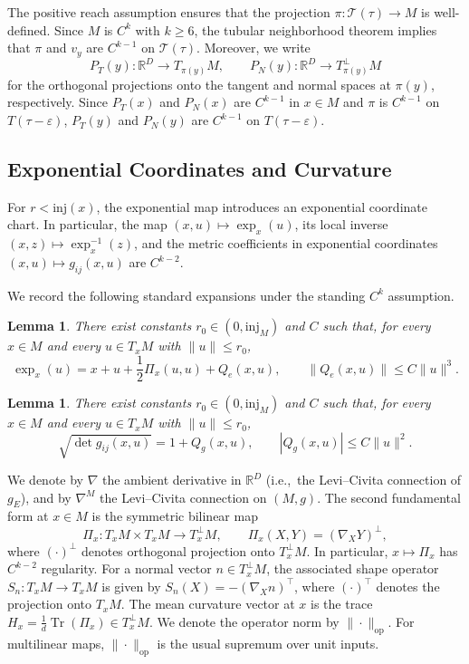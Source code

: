 \documentclass[11pt]{article}
\theoremstyle{plain}
\newtheorem{lemma}[theorem]{Lemma}
\theoremstyle{definition}
\begin{document}
The positive reach assumption ensures that the projection $\pi \colon \mathcal T(\tau) \to M$ is well-defined. Since $M$ is $C^k$ with $k \ge 6$, the tubular neighborhood theorem implies that $\pi$ and $v_y$ are $C^{k-1}$ on $\mathcal T(\tau)$. 
Moreover, we write
\[
P_T(y):\mathbb R^D\to T_{\pi(y)}M,
\qquad
P_N(y):\mathbb R^D\to T_{\pi(y)}^\perp M
\]
for the orthogonal projections onto the tangent and normal spaces at $\pi(y)$, respectively. Since $P_T(x)$ and $P_N(x)$ are $C^{k-1}$ in $x\in M$ and $\pi$ is $C^{k-1}$ on $T(\tau-\varepsilon)$, $P_T(y)$ and $P_N(y)$ are $C^{k-1}$ on $T(\tau-\varepsilon)$. 

\subsection{Exponential Coordinates and Curvature}
For $r < \mathrm{inj}(x)$, the exponential map introduces an exponential coordinate chart.
In particular, the map $(x,u)\mapsto \exp_x(u)$, its local inverse $(x,z)\mapsto \exp_x^{-1}(z)$, and the metric coefficients in exponential coordinates $(x,u)\mapsto g_{ij}(x,u)$ are $C^{k-2}$.

We record the following standard expansions under the standing $C^k$ assumption. 
\begin{lemma}\label{lem:exponential-map-expansion}
There exist constants $r_0\in(0,\mathrm{inj}_M)$ and $C$ such that, for every $x\in M$ and every $u\in T_xM$ with $\|u\|\le r_0$,
\[
\exp_x(u)
=
x+u+\frac12\Pi_x(u,u)+Q_e(x,u),
\qquad
\|Q_e(x,u)\|\le C\|u\|^3.
\]
\end{lemma}

\begin{lemma}\label{lem:volume-element-expansion}
There exist constants $r_0\in(0,\mathrm{inj}_M)$ and $C$ such that, for every $x\in M$ and every $u\in T_xM$ with $\|u\|\le r_0$,
\[
\sqrt{\det g_{ij}(x,u)}
=
1+Q_g(x,u),
\qquad
|Q_g(x,u)|\le C\|u\|^2.
\]
\end{lemma}
We denote by $\nabla$ the ambient derivative in $\mathbb{R}^D$ (i.e.,\ the Levi--Civita connection of $g_E$), and by $\nabla^M$ the Levi--Civita connection on $(M,g)$. The second fundamental form at $x \in M$ is the symmetric bilinear map
\[
  \Pi_x \colon T_x M \times T_x M \to T_x^\perp M, \qquad
  \Pi_x(X,Y) = (\nabla_X Y)^\perp,
\]
where $(\cdot)^\perp$ denotes orthogonal projection onto $T_x^\perp M$. In particular, $x\mapsto \Pi_x$ has $C^{k-2}$ regularity. For a normal vector $n \in T_x^\perp M$, the associated shape operator $S_n \colon T_x M \to T_x M$ is given by $S_n(X) = -(\nabla_X n)^\top$, where $(\cdot)^\top$ denotes the projection onto $T_x M$. The mean curvature vector at $x$ is the trace $H_x = \frac{1}{d}\operatorname{Tr}(\Pi_x) \in T_x^\perp M$. We denote the operator norm by $\|\cdot\|_{\mathrm{op}}$. For multilinear maps, $\|\cdot\|_{\mathrm{op}}$ is the usual supremum over unit inputs.
\end{document}
